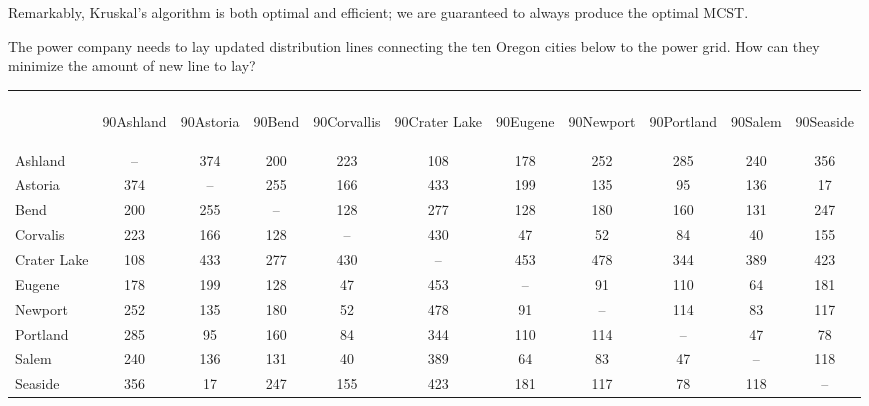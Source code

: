 Remarkably, Kruskal's algorithm is both optimal and efficient; we are guaranteed to always produce the optimal MCST.


\begin{example}{}{} %
The power company needs to lay updated distribution lines connecting the ten Oregon cities below to the power grid.  How can they minimize the amount of new line to lay?
 
\begin{center}
\begin{tabular}{|l|c|c|c|c|c|c|c|c|c|c|}
\hline
&&&&&&&&&&\\[7ex]
& \begin{rotate}{90}Ashland \end{rotate}& \begin{rotate}{90}Astoria\end{rotate}  & \begin{rotate}{90}Bend \end{rotate}& \begin{rotate}{90}Corvallis \end{rotate} & \begin{rotate}{90}Crater Lake \end{rotate} &  \begin{rotate}{90}Eugene  \end{rotate}&  \begin{rotate}{90}Newport \end{rotate} &  \begin{rotate}{90}Portland  \end{rotate}& \begin{rotate}{90}Salem \end{rotate} &  \begin{rotate}{90}Seaside \end{rotate}\\
\hline
Ashland & --&374&200&223&108&178&252&285&240&356\\
\hline
Astoria & 374&--&255&166&433&199&135&95&136&17\\
\hline
Bend & 200 & 255 &--&128&277&128&180 & 160&131&247\\
\hline
Corvalis&223&166&128&--&430&47&52&84&40&155\\
\hline
Crater Lake &108&433&277&430&--&453&478&344&389&423\\
\hline
Eugene &178&199&128&47&453&--&91&110&64&181\\
\hline
Newport&252&135&180&52&478&91&--&114&83&117\\
\hline
Portland &285&95&160&84&344&110&114&--&47&78\\
\hline
Salem & 240 &136&131&40&389&64&83&47&--&118\\
\hline
Seaside&356&17&247&155&423&181&117&78&118&--\\
\hline
\end{tabular}
\end{center}


\end{example}
